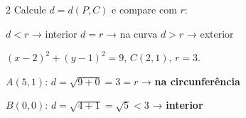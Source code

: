 \documentclass[12pt]{article}
\begin{document}
\begin{multicols}{2}
Calcule $d = d(P, C)$ e compare com $r$:

$d < r$ → interior \quad $d = r$ → na curva \quad $d > r$ → exterior

 $(x-2)^2 + (y-1)^2 = 9$, $C(2,1)$, $r = 3$.

$A(5,1)$: $d = \sqrt{9+0} = 3 = r$ → \textbf{na circunferência}

$B(0,0)$: $d = \sqrt{4+1} = \sqrt{5} < 3$ → \textbf{interior}


\end{multicols}


\end{document}
